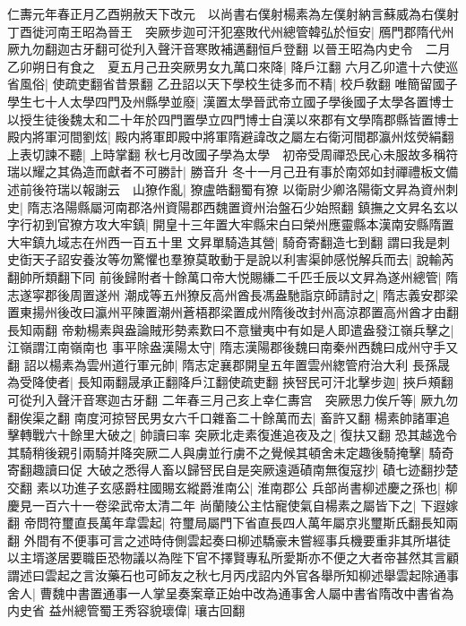 仁夀元年春正月乙酉朔赦天下改元　以尚書右僕射楊素為左僕射納言蘇威為右僕射　丁酉徙河南王昭為晉王　突厥步迦可汗犯塞敗代州總管韓弘於恒安|{
	鴈門郡隋代州厥九勿翻迦古牙翻可從刋入聲汗音寒敗補邁翻恒戶登翻}
以晉王昭為内史令　二月乙卯朔日有食之　夏五月己丑突厥男女九萬口來降|{
	降戶江翻}
六月乙卯遣十六使巡省風俗|{
	使疏吏翻省昔景翻}
乙丑詔以天下學校生徒多而不精|{
	校戶敎翻}
唯簡留國子學生七十人太學四門及州縣學並廢|{
	漢置太學晉武帝立國子學後國子太學各置博士以授生徒後魏太和二十年於四門置學立四門博士自漢以來郡有文學隋郡縣皆置博士}
殿内將軍河間劉炫|{
	殿内將軍即殿中將軍隋避諱改之屬左右衛河間郡瀛州炫熒絹翻}
上表切諫不聽|{
	上時掌翻}
秋七月改國子學為太學　初帝受周禪恐民心未服故多稱符瑞以耀之其偽造而獻者不可勝計|{
	勝音升}
冬十一月己丑有事於南郊如封禪禮板文備述前後符瑞以報謝云　山獠作亂|{
	獠盧皓翻蜀有獠}
以衛尉少卿洛陽衛文昇為資州刺史|{
	隋志洛陽縣屬河南郡洛州資陽郡西魏置資州治盤石少始照翻}
鎮撫之文昇名玄以字行初到官獠方攻大牢鎮|{
	開皇十三年置大牢縣宋白曰榮州應靈縣本漢南安縣隋置大牢鎮九域志在州西一百五十里}
文昇單騎造其營|{
	騎奇寄翻造七到翻}
謂曰我是刺史衘天子詔安養汝等勿驚懼也羣獠莫敢動于是說以利害渠帥感悦解兵而去|{
	說輸芮翻帥所類翻下同}
前後歸附者十餘萬口帝大悦賜縑二千匹壬辰以文昇為遂州總管|{
	隋志遂寜郡後周置遂州}
潮成等五州獠反高州酋長馮盎馳詣京師請討之|{
	隋志義安郡梁置東揚州後改曰瀛州平陳置潮州蒼梧郡梁置成州隋後改封州高涼郡置高州酋才由翻長知兩翻}
帝勅楊素與盎論賊形勢素歎曰不意蠻夷中有如是人即遣盎發江嶺兵擊之|{
	江嶺謂江南嶺南也}
事平除盎漢陽太守|{
	隋志漢陽郡後魏曰南秦州西魏曰成州守手又翻}
詔以楊素為雲州道行軍元帥|{
	隋志定襄郡開皇五年置雲州緫管府治大利}
長孫晟為受降使者|{
	長知兩翻晟承正翻降戶江翻使疏吏翻}
挾唘民可汗北擊步迦|{
	挾戶頰翻可從刋入聲汗音寒迦古牙翻}
二年春三月己亥上幸仁夀宫　突厥思力俟斤等|{
	厥九勿翻俟渠之翻}
南度河掠唘民男女六千口雜畜二十餘萬而去|{
	畜許又翻}
楊素帥諸軍追擊轉戰六十餘里大破之|{
	帥讀曰率}
突厥北走素復進追夜及之|{
	復扶又翻}
恐其越逸令其騎稍後親引兩騎并降突厥二人與虜並行虜不之覺候其頓舍未定趣後騎掩擊|{
	騎奇寄翻趣讀曰促}
大破之悉得人畜以歸唘民自是突厥遠遁磧南無復寇抄|{
	磧七迹翻抄楚交翻}
素以功進子玄感爵柱國賜玄縱爵淮南公|{
	淮南郡公}
兵部尚書柳述慶之孫也|{
	柳慶見一百六十一卷梁武帝太清二年}
尚蘭陵公主怙寵使氣自楊素之屬皆下之|{
	下遐嫁翻}
帝問符璽直長萬年韋雲起|{
	符璽局屬門下省直長四人萬年屬京兆璽斯氏翻長知兩翻}
外間有不便事可言之述時侍側雲起奏曰柳述驕豪未嘗經事兵機要重非其所堪徒以主壻遂居要職臣恐物議以為陛下官不擇賢專私所愛斯亦不便之大者帝甚然其言顧謂述曰雲起之言汝藥石也可師友之秋七月丙戌詔内外官各舉所知柳述舉雲起除通事舍人|{
	曹魏中書置通事一人掌呈奏案章正始中改為通事舍人屬中書省隋改中書省為内史省}
益州總管蜀王秀容貌瓌偉|{
	瓖古回翻}

